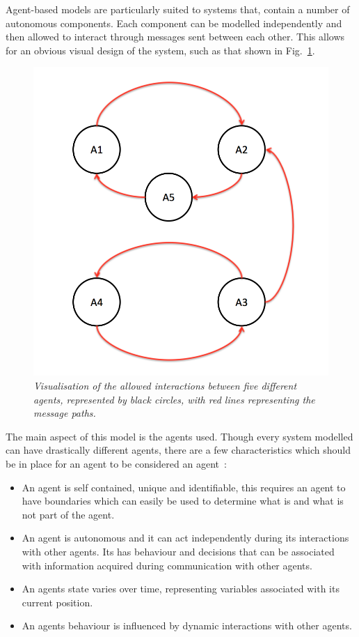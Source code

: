 \documentclass{article}
\begin{document}
Agent-based models are particularly suited to systems that, contain a number of autonomous components. Each component can be modelled independently and then allowed to interact through messages sent between each other. This allows for an obvious visual design of the system, such as that shown in Fig.~\ref{fig:abmii}.
\begin{figure}[H]
	\centering
	\includegraphics[scale=0.5]{abmii}
	\caption{\it Visualisation of the allowed interactions between five different agents, represented by black circles, with red lines representing the message paths.}
	\label{fig:abmii}
\end{figure} 
The main aspect of this model is the agents used. Though every system modelled can have drastically different agents, there are a few characteristics which should be in place for an agent to be considered an agent~\cite{MN2010, abmtsd}:
\begin{itemize}
   \item An agent is self contained, unique and identifiable, this requires an agent to have boundaries which can easily be used to determine what is and what is not part of the agent. 
   \item An agent is autonomous and it can act independently during its interactions with other agents. Its has behaviour and decisions that can be associated with information acquired  during communication with other agents. 
   \item An agent\textsc{}s state varies over time, representing variables associated with its current position. 
   \item An agent\textsc{}s behaviour is influenced by dynamic interactions with other agents. 
\end{itemize}
\end{document}
